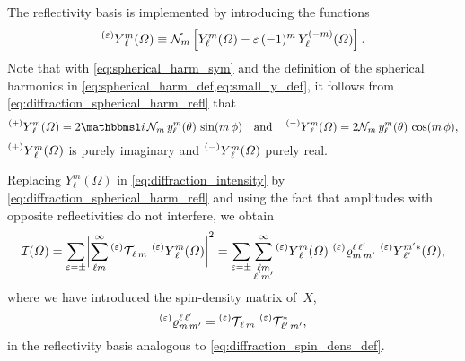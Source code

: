 The reflectivity basis is implemented by introducing the functions
\begin{equation}
  \label{eq:diffraction_spherical_harm_refl}
  \prescript{(\refl)}{}{Y}_\ell^m(\Omega)
  \equiv \mathcal{N}_m \sBrk[2]{Y_\ell^m(\Omega) - \refl\, (-1)^m\, Y_\ell^{(-m)}(\Omega)}.
\end{equation}
Note that with \cref{eq:spherical_harm_sym} and the definition of the
spherical harmonics in \cref{eq:spherical_harm_def,eq:small_y_def}, it
follows from \cref{eq:diffraction_spherical_harm_refl} that
\begin{equation}
  \prescript{(+)}{}{Y}_\ell^m(\Omega)
  = 2 \imag\, \mathcal{N}_m\, y_\ell^m(\theta)\, \sin(m\, \phi)
  \quad\text{and}\quad
  \prescript{(-)}{}{Y}_\ell^m(\Omega)
  = 2 \mathcal{N}_m\, y_\ell^m(\theta)\, \cos(m\, \phi),
\end{equation}
\ie $\prescript{(+)}{}{Y}_\ell^m(\Omega)$ is purely imaginary and
$\prescript{(-)}{}{Y}_\ell^m(\Omega)$ purely real.

Replacing $Y_\ell^m(\Omega)$ in \cref{eq:diffraction_intensity} by
\cref{eq:diffraction_spherical_harm_refl} and using the fact that
amplitudes with opposite reflectivities do not interfere, we obtain
\begin{equation}
  \label{eq:diffraction_intensity_refl}
  \intensity(\Omega)
  = \sum_{\refl = \pm} \Abs[3]{\sum_{\ell m}^\infty \prescript{(\refl)}{}{\prodAmp}_{\!\ell\, m}\, \prescript{(\refl)}{}{Y}_\ell^m(\Omega)}^2
  = \sum_{\refl = \pm} \sum_{\substack{\ell m \\ \ell' m'}}^\infty
  \prescript{(\refl)}{}{Y}_\ell^m(\Omega)\, \prescript{(\refl)}{}{\varrho}^{\ell\, \ell'}_{m\, m'}\, \prescript{(\refl)}{}{Y}_{\ell'}^{m' *}(\Omega),
\end{equation}
where we have introduced the spin-density matrix of~$X$,
\begin{equation}
  \label{eq:diffraction_refl_spin-dens}
  \prescript{(\ensuremath{\varepsilon})}{}{\varrho}^{\ell\, \ell'}_{m\, m'}
  = \prescript{(\ensuremath{\varepsilon})}{}{\ensuremath{\mathcal{T}}}_{\!\ell\, m}\, \prescript{(\ensuremath{\varepsilon})}{}{\ensuremath{\mathcal{T}}}_{\!\ell'\, m'}^*,
\end{equation}
in the reflectivity basis analogous to
\cref{eq:diffraction_spin_dens_def}.

